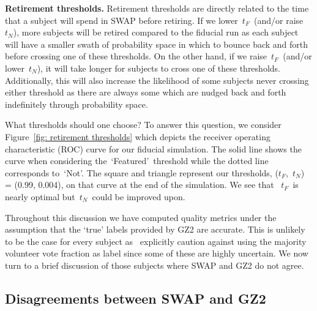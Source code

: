 \documentclass[twocolumn]{aastex6}
\newcommand{\tf}{$t_F$}
\newcommand{\tn}{$t_N$}
\newcommand{\feat}{`Featured'}
\newcommand{\notfeat}{`Not'}
\begin{document}
\textbf{Retirement thresholds.}
Retirement thresholds are directly related to the time that a subject will spend
in SWAP before retiring.  If we lower~\tf~(and/or raise~\tn), more subjects will be retired
compared to the fiducial run as each subject will have a smaller swath of probability space
in which to bounce back and forth before crossing one of these thresholds.
On the other hand, if we raise~\tf~(and/or lower~\tn), it will take longer for subjects
to cross one of these thresholds. Additionally, this will also increase the likelihood of
some subjects never crossing either threshold as there are always some 
which are nudged back and forth indefinitely through probability space.


What thresholds should one choose? To answer this question, we consider
Figure~\ref{fig: retirement thresholds} which depicts the receiver operating 
characteristic (ROC) curve for our fiducial simulation. The solid line shows the 
curve when considering the~\feat~threshold  while the dotted line
corresponds to~\notfeat. The square and triangle represent our thresholds, 
(\tf,~\tn) = (0.99, 0.004), on that curve at the end of the simulation.  We see that 
~\tf~is nearly optimal but~\tn~could be improved upon. 


Throughout this discussion we have computed quality metrics under the assumption
that the `true' labels provided by GZ2 are accurate. 
This is unlikely to be the case for every subject as~\cite{Willett2013} explicitly caution against using 
the majority volunteer vote fraction as label since some of these are highly uncertain. 
We now turn to a brief discussion of those subjects where SWAP and GZ2 do not agree. 



\subsection{Disagreements between SWAP and GZ2}
\end{document}

